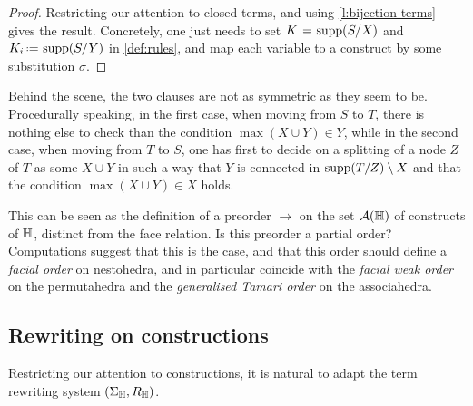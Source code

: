 \begin{proof}
  Restricting our attention to closed terms, and using \cref{l:bijection-terms} gives the result. 
  Concretely, one just needs to set $K\eqdef \supp(\occ{S}{X})$ and $K_i\eqdef \supp(\occ{S}{Y})$ in \cref{def:rules}, and map each variable to a construct by some substitution $\sigma$.
\end{proof}

Behind the scene, the two clauses are not as symmetric as they seem to be. 
Procedurally speaking, in the first case, when moving from $S$ to $T$, there is nothing else to check than the condition $\max(X\cup Y)\in Y$, while in the second case, when moving from $T$ to $S$, one has first to decide on a splitting of a node $Z$ of $T$ as some $X\cup Y$ in such a way that $Y$ is connected in $\operatorname{supp}(T/Z)\setminus X$ and  that  the condition $\max(X\cup Y)\in X$ holds.

\begin{rem}
  This can be seen as the definition of a preorder $\to$ on the set $\mathcal{A}({\mathbb H})$ of constructs of ${\mathbb H}$, distinct from the face relation. 
  Is this preorder a partial order?
  Computations suggest that this is the case, and that this order should define a \emph{facial order} on nestohedra, and in particular coincide with the \emph{facial weak order} \cite{KrobLatapyNovelliPhanSchwer,PalaciosRonco,DermenjianHohlwegPilaud} on the permutahedra and the \emph{generalised Tamari order} \cite{Ronco-Tamari} on the associahedra.
\end{rem}


\subsection{Rewriting on constructions}
\label{ss:rewriting-constructions}

Restricting our attention to constructions, it is natural to adapt the term rewriting system  $(\Sigma_{\mathbb H},R_{\mathbb H})$.

